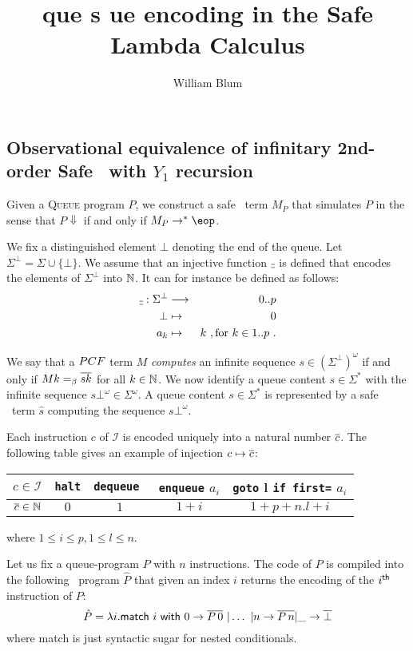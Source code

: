 \documentclass{article}
\author{William Blum}
\title{que s ue encoding in the Safe Lambda Calculus}
\begin{document}
\maketitle


\subsection{Observational equivalence of infinitary 2nd-order Safe \pcf\ with $Y_1$ recursion}

Given a \textsc{Queue} program $P$, we construct a safe \pcf\ term $M_P$ that simulates $P$ in the sense that $P \Downarrow$ if and only if $M_P \rightarrow^* \eop$.

We fix a distinguished element $\bot$ denoting the end of the queue. Let $\Sigma^\bot = \Sigma \cup \{ \bot \}$. We assume that an injective function $\overline{\underline{\ }}$ is defined that encodes  the
elements of $\Sigma^\bot$ into $\mathbb{N}$. It can for instance be defined as follows:
\begin{eqnarray*}
\overline{\underline{\ }} : \Sigma^\bot &\longrightarrow& 0..p \\
 \bot &\mapsto& 0 \\
 a_k &\mapsto& k \ , \mbox{for } k \in 1..p \ .
\end{eqnarray*}

We say that a ${PCF}$ term $M$ \emph{computes} an infinite sequence $s \in {(\Sigma^\bot)}^\omega$ if and only if $M k =_\beta \overline{s k}$ for all $k\in \mathbb{N}$. We now identify a queue content $s \in \Sigma^*$ with the infinite sequence $s \bot^\omega \in \Sigma^\omega$. A queue content $s \in \Sigma^*$ is represented by a safe \pcf\ term $\hat{s}$ computing the sequence $s \bot^\omega$.

Each instruction $c$ of $\mathcal{I}$ is encoded uniquely into a natural number $\overline{c}$. The following table gives an example of injection $c\mapsto\overline{c}$:
\begin{center}
\begin{tabular}{c|c|c|c|c}
$c \in \mathcal{I}$ & {\tt halt} & {\tt dequeue } & {\tt enqueue} $a_i$ &  {\tt goto} l {\tt if first=} $a_i$ \\ \hline
$\overline{ c } \in \mathbb{N}$ & $0$ & $1$ & $1+i$ & $1+p + n.l +i$ \\
\end{tabular}
\end{center}
where $1 \leq i \leq p, 1 \leq l \leq n$.

Let us fix a queue-program $P$ with $n$ instructions.
The code of $P$ is compiled into the following \pcf\ program $\hat{P}$
that given an index $i$ returns the encoding of the $i^{\sf th}$ instruction of $P$:
\begin{equation}
\hat{P} = \lambda i .  {\sf match\ } i {\sf \ with\ }
   0 \rightarrow \overline{ P\, 0 }
  \ | \ldots \ | n \rightarrow \overline{ P\, n }  | \_ \rightarrow \overline{\bot}
\end{equation}
where {\sf match} is just syntactic sugar for nested conditionals.
\end{document}
